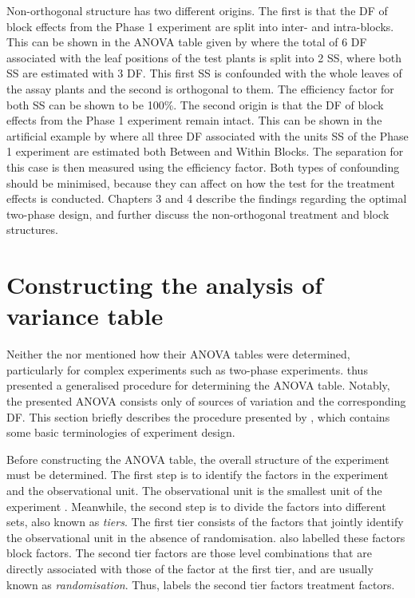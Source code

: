 \documentclass[11pt,a4paper]{article}
\begin{document}
Non-orthogonal structure has two different origins. The first is that the DF of block effects from the Phase 1 experiment are split into inter- and intra-blocks. This can be shown in the ANOVA table given by \cite{Curnow1959} where the total of 6 DF associated with the leaf positions of the test plants is split into 2 SS, where both SS are estimated with 3 DF. This first SS is confounded with the whole leaves of the assay plants and the second is orthogonal to them. The efficiency factor for both SS can be shown to be 100\%. The second origin is that the DF of block effects from the Phase 1 experiment remain intact. This can be shown in the artificial example by \cite{Wood1988} where all three DF associated with the units SS of the Phase 1 experiment are estimated both Between and Within Blocks. The separation for this case is then measured using the efficiency factor. Both types of confounding should be minimised, because they can affect on how the test for the treatment effects is conducted. Chapters 3 and 4 describe the findings regarding the optimal two-phase design, and further discuss the non-orthogonal treatment and block structures. 

\section{Constructing the analysis of variance table}
Neither the \cite{McIntyre1955} nor \cite{Curnow1959} mentioned how their ANOVA tables were determined, particularly for complex experiments such as two-phase experiments. \cite{Brien1983} thus presented a generalised procedure for determining the ANOVA table. Notably, the presented ANOVA consists only of sources of variation and the corresponding DF. This section briefly describes the procedure presented by \cite{Brien1983}, which contains some basic terminologies of experiment design.

Before constructing the ANOVA table, the overall structure of the experiment must be determined. The first step is to identify the factors in the experiment and the observational unit. The observational unit is the smallest unit of the experiment \cite{Bailey2008}. Meanwhile, the second step is to divide the factors into different sets, also known as \emph{tiers}. The first tier consists of the factors that jointly identify the observational unit in the absence of randomisation. \cite{Nelder1965A} also labelled these factors block factors. The second tier factors are those level combinations that are directly associated with those of the factor at the first tier, and are usually known as \emph{randomisation}. Thus, \cite{Nelder1965B} labels the second tier factors treatment factors.
 
\end{document}
